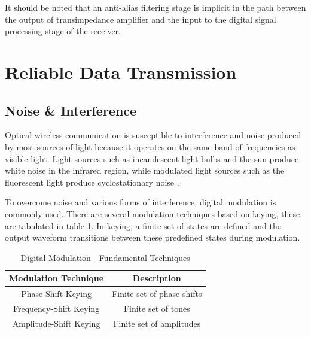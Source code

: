 It should be noted that an anti-alias filtering stage is implicit in the path between the output of transimpedance amplifier and the input to the digital signal processing stage of the receiver.



\section{Reliable Data Transmission}

\subsection{Noise \& Interference}


Optical wireless communication is susceptible to interference and noise produced by most sources of light because it operates on the same band of frequencies as visible light. Light sources such as incandescent light bulbs and the sun produce white noise in the infrared region, while modulated light sources such as the fluorescent light produce cyclostationary noise \cite{Carruther2000}.

To overcome noise and various forms of interference, digital modulation is commonly used. There are several modulation techniques based on keying, these are tabulated in table \ref{tbl:types_of_keying}. In keying, a finite set of states are defined and the output waveform transitions between these predefined states during modulation.

\begin{table}[H]
	\centering
	\begin{tabular}{cc}
		\hline
		\textbf{Modulation Technique} & \textbf{Description} \\ \hline
		Phase-Shift Keying & Finite set of phase shifts \\ \hline
		Frequency-Shift Keying & Finite set of tones \\ \hline
		Amplitude-Shift Keying & Finite set of amplitudes \\ \hline
	\end{tabular}
	\caption{Digital Modulation - Fundamental Techniques}
	\label{tbl:types_of_keying}
\end{table}


